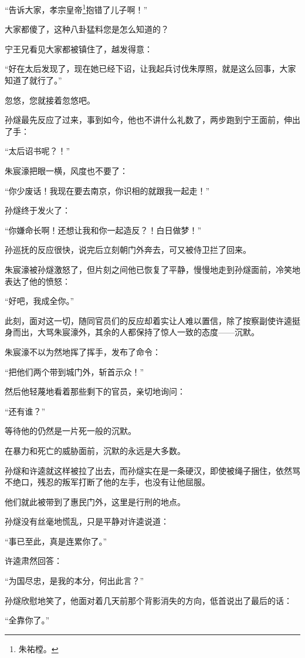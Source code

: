 \begin{multicols}{\theparacolNo}
		“告诉大家，孝宗皇帝\footnote{朱祐樘。}抱错了儿子啊！”

		大家都傻了，这种八卦猛料您是怎么知道的？

		宁王兄看见大家都被镇住了，越发得意：

		“好在太后发现了，现在她已经下诏，让我起兵讨伐朱厚照，就是这么回事，大家知道了就行了。”

		忽悠，您就接着忽悠吧。

		孙燧最先反应了过来，事到如今，他也不讲什么礼数了，两步跑到宁王面前，伸出了手：

		“太后诏书呢？！”

		朱宸濠把眼一横，风度也不要了：

		“你少废话！我现在要去南京，你识相的就跟我一起走！”

		孙燧终于发火了：

		“你嫌命长啊！还想让我和你一起造反？！白日做梦！”

		孙巡抚的反应很快，说完后立刻朝门外奔去，可又被侍卫拦了回来。

		朱宸濠被孙燧激怒了，但片刻之间他已恢复了平静，慢慢地走到孙燧面前，冷笑地表达了他的愤怒：

		“好吧，我成全你。”

		此刻，面对这一切，随同官员们的反应却着实让人难以置信，除了按察副使许逵挺身而出，大骂朱宸濠外，其余的人都保持了惊人一致的态度——沉默。

		朱宸濠不以为然地挥了挥手，发布了命令：

		“把他们两个带到城门外，斩首示众！”

		然后他轻蔑地看着那些剩下的官员，亲切地询问：

		“还有谁？”

		等待他的仍然是一片死一般的沉默。

		在暴力和死亡的威胁面前，沉默的永远是大多数。

		孙燧和许逵就这样被拉了出去，而孙燧实在是一条硬汉，即使被绳子捆住，依然骂不绝口，残忍的叛军打断了他的左手，也没有让他屈服。

		他们就此被带到了惠民门外，这里是行刑的地点。

		孙燧没有丝毫地慌乱，只是平静对许逵说道：

		“事已至此，真是连累你了。”

		许逵肃然回答：

		“为国尽忠，是我的本分，何出此言？”

		孙燧欣慰地笑了，他面对着几天前那个背影消失的方向，低首说出了最后的话：

		“全靠你了。”


\end{multicols}

